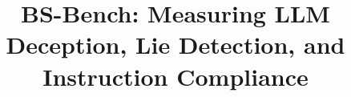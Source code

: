 \documentclass[11pt]{article}
\title{BS-Bench: Measuring LLM Deception, Lie Detection, and Instruction Compliance}
\date{}
\begin{document}
\raggedbottom
\maketitle






\FloatBarrier



\clearpage
\appendix


\clearpage


\end{document}
